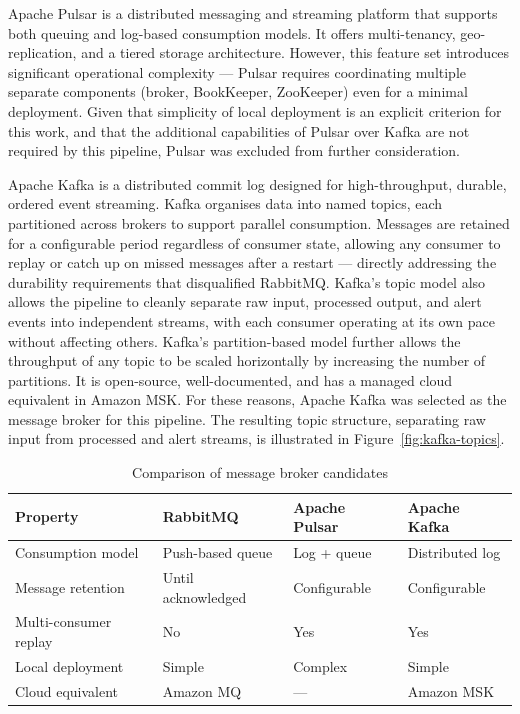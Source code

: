 Apache Pulsar is a distributed messaging and streaming platform that supports both queuing and log-based consumption models. It offers multi-tenancy, geo-replication, and a tiered storage architecture. However, this feature set introduces significant operational complexity — Pulsar requires coordinating multiple separate components (broker, BookKeeper, ZooKeeper) even for a minimal deployment. Given that simplicity of local deployment is an explicit criterion for this work, and that the additional capabilities of Pulsar over Kafka are not required by this pipeline, Pulsar was excluded from further consideration.

Apache Kafka is a distributed commit log designed for high-throughput, durable, ordered event streaming. Kafka organises data into named topics, each partitioned across brokers to support parallel consumption. Messages are retained for a configurable period regardless of consumer state, allowing any consumer to replay or catch up on missed messages after a restart — directly addressing the durability requirements that disqualified RabbitMQ. Kafka's topic model also allows the pipeline to cleanly separate raw input, processed output, and alert events into independent streams, with each consumer operating at its own pace without affecting others. Kafka's partition-based model further allows the throughput of any topic to be scaled horizontally by increasing the number of partitions. It is open-source, well-documented, and has a managed cloud equivalent in Amazon MSK. For these reasons, Apache Kafka was selected as the message broker for this pipeline. The resulting topic structure, separating raw input from processed and alert streams, is illustrated in Figure~\ref{fig:kafka-topics}.

\begin{table}[H]
\centering
\caption{Comparison of message broker candidates}
\label{tab:broker-comparison}
\begin{tabular}{|l|l|l|l|}
\hline
\textbf{Property} & \textbf{RabbitMQ} & \textbf{Apache Pulsar} & \textbf{Apache Kafka} \\
\hline
Consumption model      & Push-based queue   & Log + queue       & Distributed log \\\hline
Message retention      & Until acknowledged & Configurable      & Configurable    \\\hline
Multi-consumer replay  & No                 & Yes               & Yes             \\\hline
Local deployment       & Simple             & Complex           & Simple          \\\hline
Cloud equivalent       & Amazon MQ          & —                 & Amazon MSK      \\\hline
\end{tabular}
\end{table}

